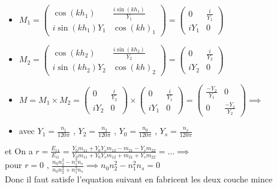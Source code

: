 \documentclass[12pt]{book}
\begin{document}
            \begin{itemize}
                \item $M_1 =
                \begin{pmatrix}
                    \cos(kh_1) & \frac{i\sin(kh_1)}{Y_1} \\
                    i\sin(kh_1)Y_1 & \cos(kh)_1 
                \end{pmatrix} =
                \begin{pmatrix}
                    0 & \frac{i}{Y_1} \\
                    iY_1 & 0
                \end{pmatrix}$
                \item $M_2 =
                \begin{pmatrix}
                    \cos(kh_2) & \frac{i\sin(kh_2)}{Y_2} \\
                    i\sin(kh_2)Y_2 & \cos(kh)_2 
                \end{pmatrix} =
                \begin{pmatrix}
                    0 & \frac{i}{Y_2} \\
                    iY_2 & 0
                \end{pmatrix}$
                \item  $M = M_1 \times M_2 =\begin{pmatrix} 0 & \frac{i}{Y_2} \\ iY_2 & 0\end{pmatrix} \times\begin{pmatrix} 0 & \frac{i}{Y_1} \\iY_1 & 0 \end{pmatrix} = \begin{pmatrix} \frac{-Y_2}{Y_1} & 0 \\0 & \frac{-Y_1}{Y_2} \end{pmatrix} \implies$  \\
                \item avec $Y_1 =\frac{n_1}{120\pi}$ , $Y_2 =\frac{n_2}{120\pi}$ , $Y_0 =\frac{n_0}{120\pi}$ , $Y_s =\frac{n_s}{120\pi}$
            \end{itemize}
            et On a $r=\frac{E_{r1}}{E_{i1}} = \frac{Y_0m_{11}+Y_0Y_sm_{12}-m_{21}-Y_sm_{22}}{Y_0m_{11}+Y_0Y_sm_{12}+m_{21}+Y_sm_{22}} =\ldots  \implies$ \\
            pour $r = 0 $ , $\frac{n_0n_2^2-n_1^2n_s}{n_0n_2^2+n_1^2n_s}\implies n_0n_2^2-n_1^2n_s =0$ \\
            Donc il faut satisfe l'equation suivant  en fabricent les deux couche mince 
            \pagebreak
\end{document}

